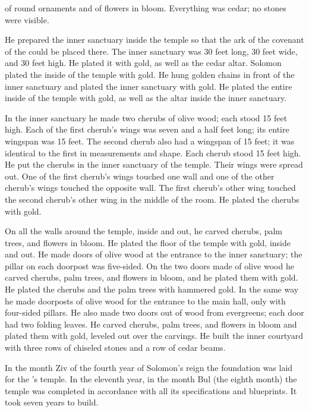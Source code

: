 {of round ornaments
and of flowers
in bloom. Everything
was cedar;
no
stones
were visible.
\par }{\PP {}He prepared
the inner sanctuary
inside
the temple
so that the ark
of the covenant
of the {}
could be
placed
there.
The inner sanctuary
was 30 feet
long,
30 feet
wide,
and 30 feet
high.
He plated
it with gold,
as well
as the cedar
altar.
Solomon
plated
the inside
of the temple
with gold.
He hung
golden
chains
in front of
the inner sanctuary
and plated
the inner sanctuary with gold.
He plated
the entire
inside of the temple
with gold,
as well as
the altar
inside the inner sanctuary.
\par }{\PP {}In the inner sanctuary
he made
two
cherubs
of olive
wood;
each stood
15 feet
high.
Each of the first
cherub’s
wings
was seven and a half feet
long; its entire wingspan
was 15 feet.
The second
cherub
also had a wingspan of 15 feet;
it was identical
to the first
in measurements
and shape.
Each
cherub
stood
15 feet
high.
He put
the
cherubs
in
the inner
sanctuary of the temple.
Their wings
were spread out.
One of the first
cherub’s
wings
touched
one wall
and one of the other
cherub’s
wings
touched
the opposite
wall.
The first cherub’s other wing
touched
the second cherub’s other wing
in the middle
of the room.
He plated
the cherubs
with gold.
\par }{\PP {}On all
the walls
around
the temple,
inside
and out,
he carved
cherubs,
palm trees,
and flowers
in bloom.
He plated
the floor
of the temple
with gold,
inside
and out.
He made
doors
of olive
wood
at the entrance
to the inner sanctuary;
the pillar
on each doorpost
was five-sided.
On the two
doors
made of olive
wood
he carved
cherubs,
palm trees,
and flowers
in bloom,
and he plated
them with gold.
He plated
the cherubs
and the palm trees
with hammered gold.
In the same
way he made
doorposts
of olive
wood
for the entrance
to the main hall,
only with four-sided pillars.
He also made
two
doors
out of wood
from evergreens;
each
door
had two
folding leaves.
He carved
cherubs,
palm trees,
and flowers
in bloom
and plated
them with gold,
leveled out
over
the carvings.
He built
the inner
courtyard
with three
rows
of chiseled
stones and a row
of cedar
beams.
\par }{\PP {}In the month
Ziv
of the fourth
year
of Solomon’s reign the foundation
was laid for the
{}’s
temple.
In the eleventh
year,
in the month
Bul
(the eighth
month) the temple
was completed
in accordance
with all
its specifications
and blueprints. It took seven
years
to build.

}
